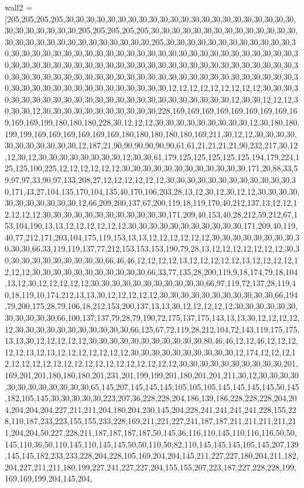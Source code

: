 wall2 = [205,205,205,205,30,30,30,30,30,30,30,30,30,30,30,30,30,30,30,30,30,30,30,30,30,30,30,30,30,30,30,30,30,205,205,205,205,205,30,30,30,30,30,30,30,30,30,30,30,30,30,30,30,30,30,30,30,30,30,30,30,30,30,30,30,30,205,30,30,30,30,30,30,30,30,30,30,30,30,30,30,30,30,30,30,30,30,30,30,30,30,30,30,30,30,30,30,30,30,30,30,30,30,30,30,30,30,30,30,30,30,30,30,30,30,30,30,30,30,30,30,30,30,30,30,30,30,30,30,30,30,30,30,30,30,30,30,30,30,30,30,30,30,30,30,30,30,30,30,30,30,30,30,30,30,30,30,30,30,30,30,30,30,30,30,30,30,30,30,30,30,30,30,30,30,30,30,30,30,12,12,12,12,12,12,12,12,12,30,30,30,30,30,30,30,30,30,30,30,30,30,30,30,30,30,30,30,30,30,30,30,30,30,12,30,30,12,12,12,30,30,30,12,30,30,30,30,30,30,30,30,30,30,30,228,169,169,169,169,169,169,169,169,169,169,169,199,180,180,180,228,30,12,12,12,30,30,30,30,30,30,30,30,30,12,30,180,180,199,199,169,169,169,169,169,169,180,180,180,180,180,169,211,30,12,12,30,30,30,30,30,30,30,30,30,30,30,12,187,21,90,90,90,90,90,90,61,61,21,21,21,21,90,232,217,30,12,12,30,12,30,30,30,30,30,30,30,30,12,30,30,61,179,125,125,125,125,125,194,179,224,125,125,100,225,12,12,12,12,12,12,30,30,30,30,30,30,30,30,30,30,30,30,171,20,88,33,59,97,97,33,90,97,133,208,27,12,12,12,12,12,12,30,30,30,30,30,30,30,30,30,30,30,30,30,171,43,27,104,135,170,104,135,40,170,106,203,28,13,12,30,12,30,12,12,30,30,30,30,30,30,30,30,30,30,30,12,66,209,200,137,67,200,119,18,119,170,40,212,137,13,12,12,12,12,12,12,30,30,30,30,30,30,30,30,30,30,30,30,171,209,40,153,40,28,212,59,212,67,153,104,190,13,13,12,12,12,12,12,12,30,30,30,30,30,30,30,30,30,30,30,171,209,40,119,40,77,212,171,203,104,175,119,153,13,13,12,12,12,12,12,12,30,30,30,30,30,30,30,30,30,30,30,66,33,119,119,137,77,212,153,153,153,190,79,28,13,12,12,12,12,12,12,12,30,30,30,30,30,30,30,30,30,30,30,66,46,46,12,12,12,12,13,12,12,12,12,12,13,12,12,12,12,12,12,12,30,30,30,30,30,30,30,30,30,30,30,66,33,77,135,28,200,119,9,18,174,79,18,104,13,12,30,12,12,12,12,12,30,30,30,30,30,30,30,30,30,30,30,66,97,119,72,137,28,119,40,18,119,10,174,212,13,13,30,12,12,12,12,12,30,30,30,30,30,30,30,30,30,30,30,66,194,79,200,175,28,79,106,18,212,153,200,137,13,13,30,12,12,12,12,12,30,30,30,30,30,30,30,30,30,30,30,66,100,137,137,79,28,79,190,72,175,137,175,143,13,13,30,12,12,12,12,12,30,30,30,30,30,30,30,30,30,30,30,66,125,67,72,119,28,212,104,72,143,119,175,175,13,13,30,12,12,12,12,12,30,30,30,30,30,30,30,30,30,30,30,80,46,46,12,12,46,12,12,12,12,12,13,12,13,12,12,12,12,12,12,12,30,30,30,30,30,30,30,30,30,30,12,174,12,12,12,12,12,12,12,12,12,12,12,12,12,12,12,12,12,12,12,12,30,30,30,30,30,30,30,30,30,30,201,169,201,201,180,180,180,201,231,201,199,199,201,180,201,201,211,30,12,30,30,30,30,30,30,30,30,30,30,30,30,65,145,207,145,145,145,105,105,105,145,145,145,145,50,145,182,105,145,30,30,30,30,30,223,207,36,228,228,204,186,139,186,228,228,228,204,204,204,204,204,227,211,211,204,180,204,230,145,204,228,241,241,241,241,228,155,228,110,187,233,223,155,155,233,228,169,211,221,227,241,187,187,211,211,211,211,211,204,204,50,227,228,211,187,187,187,187,50,145,36,116,110,145,110,116,116,50,50,145,110,36,50,110,145,110,145,145,50,50,110,50,82,110,145,145,145,105,145,207,139,145,145,182,233,233,228,204,228,105,169,204,204,145,211,227,227,180,204,211,182,204,227,211,211,180,199,227,241,227,227,204,155,155,207,223,187,227,228,228,199,169,169,199,204,145,204,